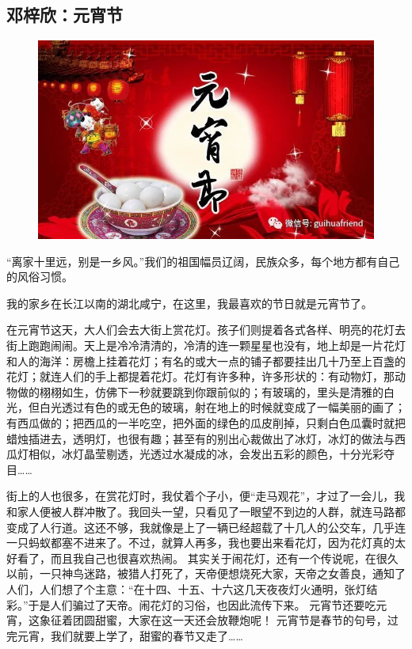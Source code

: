 \vspace{10pt}

{\centering\subsection*{邓梓欣：元宵节}}


\renewcommand{\leftmark}{邓梓欣：元宵节}

\begin{figure}[htbp]

\centering

\includegraphics[width = .5\textwidth]{./ch/37.jpg}

\end{figure}



“离家十里远，别是一乡风。”我们的祖国幅员辽阔，民族众多，每个地方都有自己的风俗习惯。

我的家乡在长江以南的湖北咸宁，在这里，我最喜欢的节日就是元宵节了。

   在元宵节这天，大人们会去大街上赏花灯。孩子们则提着各式各样、明亮的花灯去街上跑跑闹闹。天上是冷冷清清的，冷清的连一颗星星也没有，地上却是一片花灯和人的海洋：房檐上挂着花灯；有名的或大一点的铺子都要挂出几十乃至上百盏的花灯；就连人们的手上都提着花灯。花灯有许多种，许多形状的：有动物灯，那动物做的栩栩如生，仿佛下一秒就要跳到你跟前似的；有玻璃的，里头是清雅的白光，但白光透过有色的或无色的玻璃，射在地上的时候就变成了一幅美丽的画了；有西瓜做的；把西瓜的一半吃空，把外面的绿色的瓜皮削掉，只剩白色瓜囊时就把蜡烛插进去，透明灯，也很有趣；甚至有的别出心裁做出了冰灯，冰灯的做法与西瓜灯相似，冰灯晶莹剔透，光透过水凝成的冰，会发出五彩的颜色，十分光彩夺目……

街上的人也很多，在赏花灯时，我仗着个子小，便“走马观花”，才过了一会儿，我和家人便被人群冲散了。我回头一望，只看见了一眼望不到边的人群，就连马路都变成了人行道。这还不够，我就像是上了一辆已经超载了十几人的公交车，几乎连一只蚂蚁都塞不进来了。不过，就算人再多，我也要出来看花灯，因为花灯真的太好看了，而且我自己也很喜欢热闹。   其实关于闹花灯，还有一个传说呢，在很久以前，一只神鸟迷路，被猎人打死了，天帝便想烧死大家，天帝之女善良，通知了人们，人们想了个主意：“在十四、十五、十六这几天夜夜灯火通明，张灯结彩。”于是人们骗过了天帝。闹花灯的习俗，也因此流传下来。   元宵节还要吃元宵，这象征着团圆甜蜜，大家在这一天还会放鞭炮呢！    元宵节是春节的句号，过完元宵，我们就要上学了，甜蜜的春节又走了……






